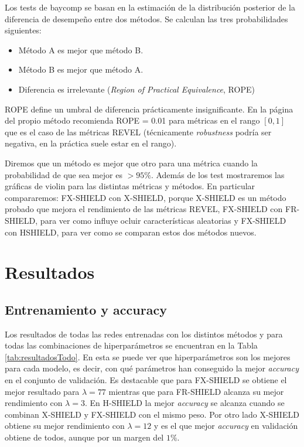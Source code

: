 Los tests de baycomp se basan en la estimación de la distribución posterior de la diferencia de desempeño entre dos métodos. Se calculan las tres probabilidades siguientes:
\begin{itemize}

\item Método A es mejor que método B.
\item Método B es mejor que método A.
\item Diferencia es irrelevante (\textit{Region of Practical Equivalence}, ROPE)

\end{itemize}

ROPE define un umbral de diferencia prácticamente insignificante. En la página del propio método recomienda ROPE = 0.01 para métricas en el rango $[0,1]$ que es el caso de las métricas REVEL (técnicamente \textit{robustness} podría ser negativa, en la práctica suele estar en el rango).

Diremos que un método es mejor que otro para una métrica cuando la probabilidad de que sea mejor es $>95\%$. Además de los test mostraremos las gráficas de violin para las distintas métricas y métodos. En particular compararemos: FX-SHIELD con X-SHIELD, porque X-SHIELD es un método probado que mejora el rendimiento de las métricas REVEL, FX-SHIELD con FR-SHIELD, para ver como influye ocluir características aleatorias y FX-SHIELD con HSHIELD, para ver como se comparan estos dos métodos nuevos.

\section{Resultados}

\subsection{Entrenamiento y accuracy}

Los resultados de todas las redes entrenadas con los distintos métodos y para todas las combinaciones de hiperparámetros se encuentran en la Tabla \ref{tab:resultadosTodo}. En esta se puede ver que hiperparámetros son los mejores para cada modelo, es decir, con qué parámetros han conseguido la mejor \textit{accuracy} en el conjunto de validación. Es destacable que para FX-SHIELD se obtiene el mejor resultado para $\lambda = 77$ mientras que para FR-SHIELD alcanza su mejor rendimiento con $\lambda = 3$. En H-SHIELD la mejor \textit{accuracy} se alcanza cuando se combinan X-SHIELD y FX-SHIELD con el mismo peso. Por otro lado X-SHIELD obtiene su mejor rendimiento con $\lambda = 12$ y es el que mejor \textit{accuracy} en validación obtiene de todos, aunque por un margen del $1\%$.



